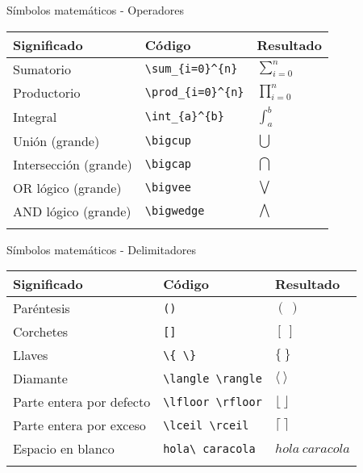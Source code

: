 \documentclass[
  ignorenonframetext,
]{beamer}
\begin{document}
\begin{frame}[fragile]{Símbolos matemáticos - Operadores}
\protect\hypertarget{suxedmbolos-matemuxe1ticos---operadores}{}
\begin{longtable}[]{@{}lll@{}}
\toprule\noalign{}
Significado & Código & Resultado \\
\midrule\noalign{}
\endhead
Sumatorio & \texttt{\textbackslash{}sum\_\{i=0\}\^{}\{n\}} &
\(\sum_{i=0}^{n}\) \\
Productorio & \texttt{\textbackslash{}prod\_\{i=0\}\^{}\{n\}} &
\(\prod_{i=0}^{n}\) \\
Integral & \texttt{\textbackslash{}int\_\{a\}\^{}\{b\}} &
\(\int_{a}^{b}\) \\
Unión (grande) & \texttt{\textbackslash{}bigcup} & \(\bigcup\) \\
Intersección (grande) & \texttt{\textbackslash{}bigcap} & \(\bigcap\) \\
OR lógico (grande) & \texttt{\textbackslash{}bigvee} & \(\bigvee\) \\
AND lógico (grande) & \texttt{\textbackslash{}bigwedge} &
\(\bigwedge\) \\
\bottomrule\noalign{}
\end{longtable}
\end{frame}

\begin{frame}[fragile]{Símbolos matemáticos - Delimitadores}
\protect\hypertarget{suxedmbolos-matemuxe1ticos---delimitadores}{}
\begin{longtable}[]{@{}lll@{}}
\toprule\noalign{}
Significado & Código & Resultado \\
\midrule\noalign{}
\endhead
Paréntesis & \texttt{()} & \((\ )\) \\
Corchetes & \texttt{{[}{]}} & \([\ ]\) \\
Llaves & \texttt{\textbackslash{}\{\ \textbackslash{}\}} & \(\{\ \}\) \\
Diamante & \texttt{\textbackslash{}langle\ \textbackslash{}rangle} &
\(\langle\ \rangle\) \\
Parte entera por defecto &
\texttt{\textbackslash{}lfloor\ \textbackslash{}rfloor} &
\(\lfloor\  \rfloor\) \\
Parte entera por exceso &
\texttt{\textbackslash{}lceil\ \textbackslash{}rceil} &
\(\lceil\ \rceil\) \\
Espacio en blanco & \texttt{hola\textbackslash{}\ caracola} &
\(hola\ caracola\) \\
\bottomrule\noalign{}
\end{longtable}
\end{frame}
\end{document}
